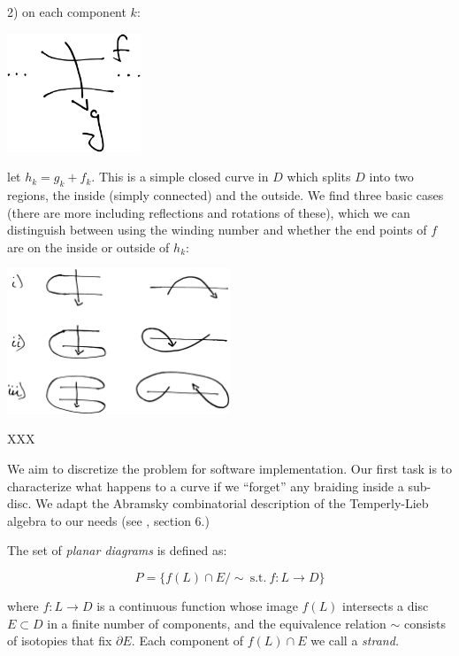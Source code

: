\documentclass[12pt,a4paper]{article}
\begin{document}
2) on each component $k$:

\begin{center}
\includegraphics[width=0.3\textwidth]{snake-component.eps}
\end{center}

let $h_k = g_k + f_k.$
This is a simple closed curve in $D$ which splits $D$
into two regions, the inside (simply connected) and the
outside.
We find three basic cases (there are more including reflections
and rotations of these), which we can distinguish between
using the winding number and whether the end points
of $f$ are on the inside or outside of $h_k$:

\begin{center}
\includegraphics[width=0.5\textwidth]{snake-cases.eps}
\end{center}

XXX



We aim to discretize the problem for software implementation.
Our first task is to characterize what happens to a curve
if we ``forget'' any braiding inside a sub-disc.
We adapt the Abramsky combinatorial description 
of the Temperly-Lieb algebra to our needs
(see \cite{Abramsky08}, section 6.) %

The set of {\it planar diagrams} is defined as:

    $$ P = \{ f(L)\cap E / \sim \ \text{s.t.}\ f:L\to D \}$$

where $f:L\to D$ is a continuous function 
whose image $f(L)$ intersects a disc $E\subset D$ in a finite number of components,
and the equivalence relation $\sim$ consists of 
isotopies that fix $\partial E.$ %
Each component of $f(L)\cap E$ we call a {\it strand.}
\end{document}
